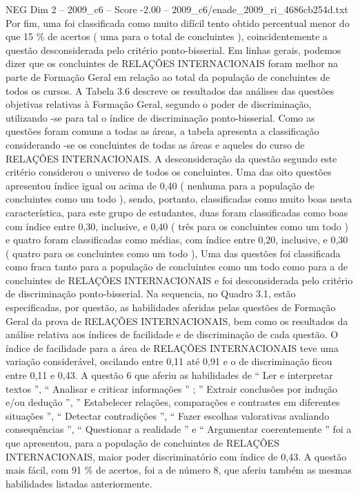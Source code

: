\begin{textsample}{NEG Dim 2 – 2009\_c6 – Score -2.00 – 2009\_c6/enade\_2009\_ri\_4686cb254d.txt}
Por fim, uma foi classificada como muito difícil tento obtido percentual menor do que 15 \% de acertos ( uma para o total de concluintes ), coincidentemente a questão desconsiderada pelo critério ponto-bisserial.
Em linhas gerais, podemos dizer que os concluintes de RELAÇÕES INTERNACIONAIS foram melhor na parte de Formação Geral em relação ao total da população de concluintes de todos os cursos.
A Tabela 3.6 descreve os resultados das análises das questões objetivas relativas à Formação Geral, segundo o poder de discriminação, utilizando -se para tal o índice de discriminação ponto-bisserial.
Como as questões foram comuns a todas as áreas, a tabela apresenta a classificação considerando -se os concluintes de todas as áreas e aqueles do curso de RELAÇÕES INTERNACIONAIS.
A desconsideração da questão segundo este critério considerou o universo de todos os concluintes.
Uma das oito questões apresentou índice igual ou acima de 0,40 ( nenhuma para a população de concluintes como um todo ), sendo, portanto, classificadas como muito boas nesta característica, para este grupo de estudantes, duas foram classificadas como boas com índice entre 0,30, inclusive, e 0,40 ( três para os concluintes como um todo ) e quatro foram classificadas como médias, com índice entre 0,20, inclusive, e 0,30 ( quatro para os concluintes como um todo ), Uma das questões foi classificada como fraca tanto para a população de concluintes como um todo como para a de concluintes de RELAÇÕES INTERNACIONAIS e foi desconsiderada pelo critério de discriminação ponto-bisserial.
Na sequencia, no Quadro 3.1, estão especificadas, por questão, as habilidades aferidas pelas questões de Formação Geral da prova de RELAÇÕES INTERNACIONAIS, bem como os resultados da análise relativa aos índices de facilidade e de discriminação de cada questão.
O índice de facilidade para a área de RELAÇÕES INTERNACIONAIS teve uma variação considerável, oscilando entre 0,11 até 0,91 e o de discriminação ficou entre 0,11 e 0,43.
A questão 6 que aferiu as habilidades de “ Ler e interpretar textos ”, “ Analisar e criticar informações ” ; ” Extrair conclusões por indução e/ou dedução ”, ” Estabelecer relações, comparações e contrastes em diferentes situações ”, “ Detectar contradições ”, “ Fazer escolhas valorativas avaliando consequências ”, “ Questionar a realidade ” e “ Argumentar coerentemente ” foi a que apresentou, para a população de concluintes de RELAÇÕES INTERNACIONAIS, maior poder discriminatório com índice de 0,43.
A questão mais fácil, com 91 \% de acertos, foi a de número 8, que aferiu também as mesmas habilidades listadas anteriormente.

\end{textsample}
